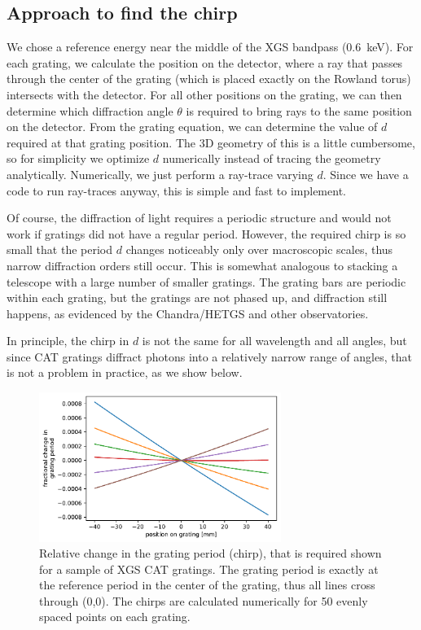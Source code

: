 \documentclass[]{spie}  %
\begin{document}
\subsection{Approach to find the chirp}
We chose a reference energy near the middle of the XGS bandpass (0.6~keV). 
For each grating, we calculate the position on the detector, where a ray that passes through the center of the grating (which is placed exactly on the Rowland torus) intersects with the detector. For all other positions on the grating, we can then determine which diffraction angle $\theta$ is required to bring rays to the same position on the detector. From the grating equation, we can determine the value of $d$ required at that grating position. The 3D geometry of this is a little cumbersome, so for simplicity we optimize $d$ numerically instead of tracing the geometry analytically. Numerically, we just perform a ray-trace varying $d$. Since we have a code to run ray-traces anyway, this is simple and fast to implement.

Of course, the diffraction of light requires a periodic structure and would not work if gratings did not have a regular period. However, the required chirp is so small that the period $d$ changes noticeably only over macroscopic scales, thus narrow diffraction orders still occur. This is somewhat analogous to stacking a telescope with a large number of smaller gratings. The grating bars are periodic within each grating, but the gratings are not phased up, and diffraction still happens, as evidenced by the Chandra/HETGS and other observatories.

In principle, the chirp in $d$ is not the same for all wavelength and all angles, but since CAT gratings diffract photons into a relatively narrow range of angles, that is not a problem in practice, as we show below.

\begin{figure} [ht]
\begin{center}
\includegraphics[width=0.7\textwidth]{chirps}
\end{center}
\caption {\label{fig:chirps}
Relative change in the grating period (chirp), that is required shown for a sample of XGS CAT gratings. The grating period is exactly at the reference period in the center of the grating, thus all lines cross through (0,0). The chirps are calculated numerically for 50 evenly spaced points on each grating.
}
\end{figure}
\end{document}
